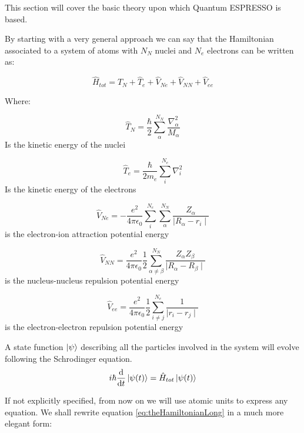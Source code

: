 \documentclass[a4paper,12pt]{article}
\begin{document}
This section will cover the basic theory upon which Quantum ESPRESSO is based.

By starting with a very general approach we can say that the Hamiltonian associated to a system of atoms with $N_N$ nuclei and $N_e$ electrons can be written as:


\begin{equation}\label{eq:theHamiltonianLong}
\hat{H}_{tot} = \hat{T}_{N} + \hat{T}_{e} + \hat{V}_{Ne} + \hat{V}_{NN} + \hat{V}_{ee}
\end{equation}

Where:

\begin{equation}
\hat{T}_{N} = \frac{\hbar}{2} \sum_{\alpha}^{N_N} \frac{\nabla_{\alpha}^2}{M_{\alpha}}
\end{equation}
Is the kinetic energy of the nuclei

\begin{equation}
\hat{T}_{e} = \frac{\hbar}{2m_{e}} \sum_{i}^{N_e} \nabla_{i}^2
\end{equation}
Is the kinetic energy of the electrons

\begin{equation}
\hat{V}_{Ne} = -\frac{e^2}{4\pi\epsilon_{0}} \sum_{i}^{N_e}\sum_{\alpha}^{N_N} \frac{Z_{\alpha}}{\mid R_{\alpha} - r_{i} \mid }
\end{equation}
is the electron-ion attraction potential energy

\begin{equation}
\hat{V}_{NN} = \frac{e^2}{4\pi\epsilon_{0}} \frac{1}{2} \sum_{\alpha \neq \beta}^{N_N} \frac{Z_{\alpha} Z_{\beta}}{\mid R_{\alpha} - R_{\beta} \mid }
\end{equation}
is the nucleus-nucleus repulsion potential energy

\begin{equation}
\hat{V}_{ee} = \frac{e^2}{4\pi\epsilon_{0}} \frac{1}{2} \sum_{i \neq j}^{N_e} \frac{1}{\mid r_{i} - r_{j} \mid }
\end{equation}
is the electron-electron repulsion potential energy

A state function $\ket{\psi}$ describing all the particles involved in the system will evolve following the Schrodinger equation.
\begin{equation}\label{eq:eq_sch}
	i\hbar\dv{t}\ket{\psi(t)} = \hat{H}_{tot}\ket{\psi(t)}
\end{equation}

If not explicitly specified, from now on we will use atomic units \cite[p.42]{Attila} to express any equation.
We shall rewrite equation \eqref{eq:theHamiltonianLong} in a much more elegant form:
\end{document}

